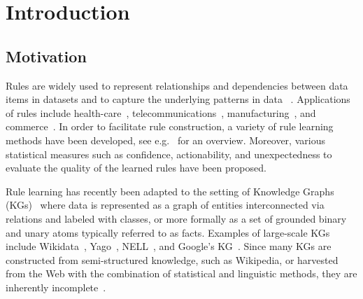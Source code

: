 
\chapter{Introduction}\label{sec:intro}

\section{Motivation}
Rules are widely used to 
represent relationships and dependencies between data items in datasets
and to capture the underlying patterns in data%
~\cite{Agrawal:1993:MAR:170036.170072,DBLP:books/mit/PF91/Piatetsky91}.
Applications of rules 
include health-care~\cite{DBLP:series/isrl/Wojtusiak14}, telecommunications~\cite{DBLP:conf/kdd/MannilaTV95}, 
manufacturing~\cite{DBLP:journals/ki/AuriolMG96}, and
commerce~\cite{DBLP:conf/pkdd/RasW00,DBLP:journals/kais/ImRW10}.
%
In order to facilitate rule construction, a variety of
rule learning methods have been developed,
see e.g.~\cite{DBLP:conf/ruleml/FurnkranzK15,association-rule-mining-overview} for an overview.
Moreover, various statistical measures such as confidence,
actionability, and unexpectedness to evaluate the quality of the learned rules have been proposed. 

Rule learning has recently been adapted to the setting of
 Knowledge Graphs (KGs)~\cite{amie,rdf2rules,gad2016,trantowards}
where data is represented as a graph of entities interconnected via relations and labeled with classes, or more formally as a set of grounded binary and unary atoms typically referred to as facts.
Examples of large-scale KGs include 
Wikidata~\cite{wikidata}, 
Yago~\cite{yago}, 
NELL~\cite{NELL-aaai15},
 and Google's KG~\cite{GoogleKG}.
Since many KGs are constructed from semi-structured knowledge, such
as Wikipedia, or harvested from the Web with the combination of statistical and linguistic methods, they are inherently incomplete~\cite{DBLP:journals/semweb/Paulheim17,amie}. 

